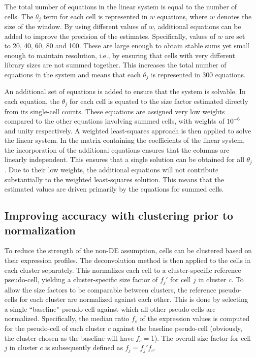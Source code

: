 \documentclass{article}
\begin{document}
The total number of equations in the linear system is equal to the number of cells.
The $\theta_j$ term for each cell is represented in $w$ equations, where $w$ denotes the size of the window.
By using different values of $w$, additional equations can be added to improve the precision of the estimates. 
Specifically, values of $w$ are set to 20, 40, 60, 80 and 100.
These are large enough to obtain stable sums yet small enough to maintain resolution, i.e., by ensuring that cells with very different library sizes are not summed together.
This increases the total number of equations in the system and means that each $\theta_j$ is represented in 300 equations. 

An additional set of equations is added to ensure that the system is solvable.
In each equation, the $\theta_j$ for each cell is equated to the size factor estimated directly from its single-cell counts.
These equations are assigned very low weights compared to the other equations involving summed cells, with weights of $10^{-6}$ and unity respectively.
A weighted least-squares approach is then applied to solve the linear system.
In the matrix containing the coefficients of the linear system, the incorporation of the additional equations ensures that the columns are linearly independent.
This ensures that a single solution can be obtained for all $\theta_j$.
Due to their low weights, the additional equations will not contribute substantially to the weighted least-squares solution.
This means that the estimated values are driven primarily by the equations for summed cells.
\subsection{Improving accuracy with clustering prior to normalization}
To reduce the strength of the non-DE assumption, cells can be clustered based on their expression profiles.
The deconvolution method is then applied to the cells in each cluster separately.
This normalizes each cell to a cluster-specific reference pseudo-cell, yielding a cluster-specific size factor of $f_{j}'$ for cell $j$ in cluster $c$.
To allow the size factors to be comparable between clusters, the reference pseudo-cells for each cluster are normalized against each other.
This is done by selecting a single ``baseline'' pseudo-cell against which all other pseudo-cells are normalized.
Specifically, the median ratio $f_c$ of the expression values is computed for the pseudo-cell of each cluster $c$ against the baseline pseudo-cell
    (obviously, the cluster chosen as the baseline will have $f_c=1$).
The overall size factor for cell $j$ in cluster $c$ is subsequently defined as $f_j = f_{j}'f_c$.
\end{document}
